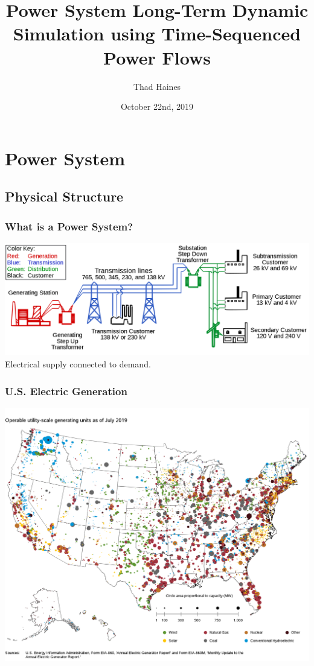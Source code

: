 \documentclass[14pt, unknownkeysallowed]{beamer}
\title{Power System Long-Term Dynamic Simulation using Time-Sequenced \\Power Flows}
\author{Thad Haines}
\institute[MT TECH]{Montana Technological University - Master's Thesis Research Project}
\date{October 22nd, 2019}
\begin{document}
	
\begin{frame}
	\titlepage
\end{frame}

\section{Power System}
\subsection{Physical Structure}
\begin{frame}
\frametitle{What is a Power System?}
\includegraphics[width=\linewidth]{largeGrid} %
Electrical supply connected to demand.\\
\end{frame}
\begin{frame}
\frametitle{U.S. Electric Generation}
\begin{center}
\includegraphics[height=.9\textheight]{july2019map} %
\end{center}
\end{frame}
\end{document}
